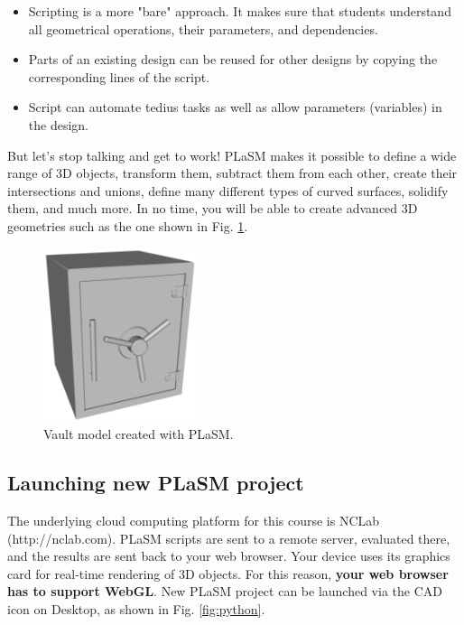 \documentclass{article}
\begin{document}
\begin{itemize}

\item Scripting is a more "bare" approach. It makes sure that students understand
      all geometrical operations, their parameters, and dependencies.
\item Parts of an existing design can be reused for other designs by copying the 
      corresponding lines of the script. 
\item Script can automate tedius tasks as well as allow parameters (variables)
      in the design. 
\end{itemize}
But let's stop talking and get to work! PLaSM makes it possible to define a wide range of 3D 
objects, transform them, subtract them from each other, create their intersections
and unions, define many different types of curved surfaces, solidify them, and 
much more. In no time, you will be able to create advanced 3D geometries such 
as the one shown in Fig. \ref{fig:vault0}.

\begin{figure}[!ht]
\begin{center}
\includegraphics[width=0.4\textwidth]{img/vault.png}
\end{center}
\vspace{-4mm}
\caption{Vault model created with PLaSM.}
\label{fig:vault0}
\end{figure}


\subsection{Launching new PLaSM project}

The underlying cloud computing platform for this course is NCLab 
(http://nclab.com).
PLaSM scripts are sent to a remote server, evaluated there, 
and the results are sent back to your web browser. Your device uses
its graphics card for real-time rendering of 3D objects. For this 
reason, {\bf your web browser has to support WebGL}. 
New PLaSM project can be launched via the CAD icon on Desktop, as shown 
in Fig. \ref{fig:python}.
\newpage
\end{document}
